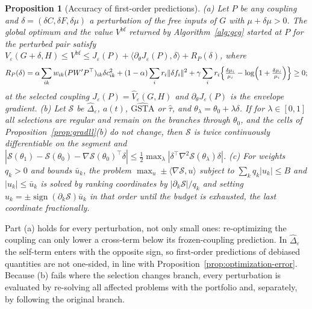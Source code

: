 \documentclass[12pt]{article}
\newtheorem{proposition}{Proposition}
\theoremstyle{definition}
\begin{document}
\begin{proposition}[Accuracy of first-order predictions]\label{prop:local}
(a) Let $P$ be any coupling and $\delta=(\delta C,\delta F,\delta\mu)$ a perturbation of the free inputs of $G$ with $\mu+\delta\mu>0$. The global optimum and the value $V^{\mathrm{bf}}$ returned by Algorithm~\ref{alg:gcg} started at $P$ for the perturbed pair satisfy
$V_\varepsilon(G+\delta,H)\le V^{\mathrm{bf}}\le J_\varepsilon(P)+\langle\partial_\theta J_\varepsilon(P),\delta\rangle+R_P(\delta)$, where
\[
R_P(\delta)=\alpha\sum_{ik}w_{ik}(PW'P^\top)_{ik}\delta c_{ik}^2+(1-\alpha)\sum_ir_i\|\delta f_i\|^2+\gamma\sum_ir_i\Bigl\{\tfrac{\delta\mu_i}{\mu_i}-\log\Bigl(1+\tfrac{\delta\mu_i}{\mu_i}\Bigr)\Bigr\}\ge0;
\]
at the selected coupling $J_\varepsilon(P)=\widehat V_\varepsilon(G,H)$ and $\partial_\theta J_\varepsilon(P)$ is the envelope gradient.
(b) Let $\mathcal S$ be $\widehat\Delta_\varepsilon$, $a(t)$, $\widehat{\mathrm{GSTA}}$ or $\hat\tau$, and $\theta_\lambda=\theta_0+\lambda\delta$. If for $\lambda\in[0,1]$ all selections are regular and remain on the branches through $\theta_0$, and the cells of Proposition~\ref{prop:gradll}(b) do not change, then $\mathcal S$ is twice continuously differentiable on the segment and
$|\mathcal S(\theta_1)-\mathcal S(\theta_0)-\nabla\mathcal S(\theta_0)^\top\delta|\le\tfrac12\max_\lambda|\delta^\top\nabla^2\mathcal S(\theta_\lambda)\delta|$.
(c) For weights $q_k>0$ and bounds $\bar u_k$, the problem $\max_u\pm\langle\nabla\mathcal S,u\rangle$ subject to $\sum_kq_k|u_k|\le B$ and $|u_k|\le\bar u_k$ is solved by ranking coordinates by $|\partial_k\mathcal S|/q_k$ and setting $u_k=\pm\operatorname{sign}(\partial_k\mathcal S)\bar u_k$ in that order until the budget is exhausted, the last coordinate fractionally.
\end{proposition}

Part (a) holds for every perturbation, not only small ones: re-optimizing the coupling can only lower a cross-term below its frozen-coupling prediction. In $\widehat\Delta_\varepsilon$ the self-term enters with the opposite sign, so first-order predictions of debiased quantities are not one-sided, in line with Proposition~\ref{prop:optimization-error}. Because (b) fails where the selection changes branch, every perturbation is evaluated by re-solving all affected problems with the portfolio and, separately, by following the original branch.
\end{document}
